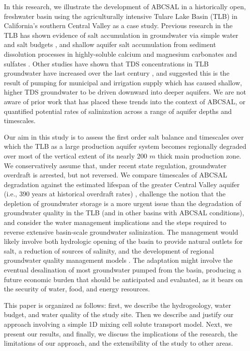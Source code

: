 In this research, we illustrate the development of ABCSAL in a historically open, freshwater basin using the agriculturally intensive Tulare Lake Basin (TLB) in California's southern Central Valley as a case study. Previous research in the TLB has shown evidence of salt accumulation in groundwater via simple water and salt budgets \citep{Kenneth1975}, and shallow aquifer salt accumulation from sediment dissolution processes in highly-soluble calcium and magnesium carbonates and sulfates \citep{Schoups2005}. Other studies have shown that TDS concentrations in TLB groundwater have increased over the last century \citep{Hansen2018, Lindsey2018}, and suggested this is the result of pumping for municipal and irrigation supply which has caused shallow, higher TDS groundwater to be driven downward into deeper aquifers. We are not aware of prior work that has placed these trends into the context of ABCSAL, or quantified potential rates of salinization across a range of aquifer depths and timescales. 

Our aim in this study is to assess the first order salt balance and timescales over which the TLB as a large production aquifer system becomes regionally degraded over most of the vertical extent of its nearly 200 $m$ thick main production zone. We conservatively assume that, under recent state regulation, groundwater overdraft is arrested, but not reversed. We compare timescales of ABCSAL degradation against the estimated lifespan of the greater Central Valley aquifer (i.e., 390 years at historical overdraft rates) \citep{Faunted.2009}, challenge the notion that the depletion of groundwater storage is a more urgent issue than the degradation of groundwater quality in the TLB (and in other basins with ABCSAL conditions), and consider the water management implications and the steps required to reverse extensive basin-scale groundwater salinization. The management would likely involve both hydrologic opening of the basin to provide natural outlets for salt, a reduction of sources of salinity, and the development of regional groundwater quality management models \citep{Fogg2006, CRWQCB2018}. The adaptation might involve the eventual desalination of most groundwater pumped from the basin, producing a future economic burden that should be anticipated and evaluated, as it bears on the security of water, food, and energy resources. 

This paper is organized as follows: first, we describe the hydrogeology, water budget, and water quality of the study site. Then we describe and justify our approach involving a simple 1D mixing cell solute transport model. Next, we present our results, and finally, we discuss the implications of the research, the limitations of our approach, and the extensibility of the study to other areas.  


